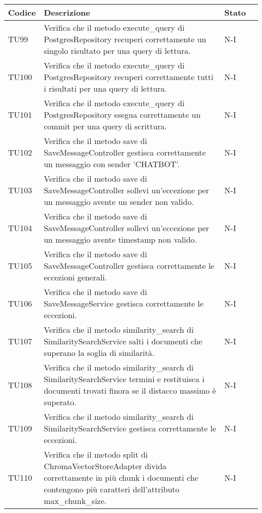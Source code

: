 \begin{table}[h!]
    \centering
    \renewcommand{\arraystretch}{1.5}
    \begin{tabularx}{\textwidth}{|p{}|X|p{}|p{}|}\hline
    \rowcolor[HTML]{FFD700}
    \textbf{Codice} & \textbf{Descrizione} & \textbf{Stato} \\ \hline
    TU99 & Verifica che il metodo execute\_query di PostgresRepository recuperi correttamente un singolo risultato per una query di lettura. &  N-I \\ \hline
    TU100 & Verifica che il metodo execute\_query di PostgresRepository recuperi correttamente tutti i risultati per una query di lettura. &  N-I \\ \hline
    TU101 & Verifica che il metodo execute\_query di PostgresRepository esegua correttamente un commit per una query di scrittura. &  N-I \\ \hline
    TU102 & Verifica che il metodo save di SaveMessageController gestisca correttamente un messaggio con sender 'CHATBOT'. &  N-I \\ \hline
    TU103 & Verifica che il metodo save di SaveMessageController sollevi un'eccezione per un messaggio avente un sender non valido. &  N-I \\ \hline
    TU104 & Verifica che il metodo save di SaveMessageController sollevi un'eccezione per un messaggio avente timestamp non valido. &  N-I \\ \hline
    TU105 & Verifica che il metodo save di SaveMessageController gestisca correttamente le eccezioni generali. &  N-I \\ \hline
    TU106 & Verifica che il metodo save di SaveMessageService gestisca correttamente le eccezioni. &  N-I \\ \hline
    TU107 & Verifica che il metodo similarity\_search di SimilaritySearchService salti i documenti che superano la soglia di similarità. &  N-I \\ \hline
    TU108 & Verifica che il metodo similarity\_search di SimilaritySearchService termini e restituisca i documenti trovati finora se il distacco massimo è superato. &  N-I \\ \hline
    TU109 & Verifica che il metodo similarity\_search di SimilaritySearchService gestisca correttamente le eccezioni. &  N-I \\ \hline
    TU110 & Verifica che il metodo split di ChromaVectorStoreAdapter divida correttamente in più chunk i documenti che contengono più caratteri dell'attributo max\_chunk\_size. &  N-I \\ \hline

\end{tabularx}
\end{table}
